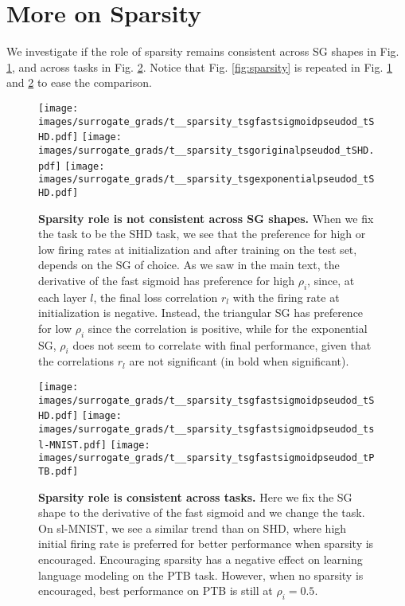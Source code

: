 \section{More on Sparsity}\label{app:more_sparsity}

We investigate if the role of sparsity remains consistent across SG shapes in Fig. \ref{fig:sparsity_and_shape}, and across tasks in Fig. \ref{fig:sparsity_and_task}. Notice that Fig. \ref{fig:sparsity} is repeated in Fig. \ref{fig:sparsity_and_shape} and \ref{fig:sparsity_and_task} to ease the comparison.


\begin{figure}
    \centering
    \vspace{.55cm}
    \texttt{[image: images/surrogate\_grads/t\_\_sparsity\_tsgfastsigmoidpseudod\_tSHD.pdf]}
    \texttt{[image: images/surrogate\_grads/t\_\_sparsity\_tsgoriginalpseudod\_tSHD.pdf]}
    \texttt{[image: images/surrogate\_grads/t\_\_sparsity\_tsgexponentialpseudod\_tSHD.pdf]}
    \caption{\textbf{Sparsity role is not consistent across SG shapes.} When we fix the task to be the SHD task, we see that the preference for high or low firing rates at initialization and after training on the test set, depends on the SG of choice. As we saw in the main text, 
    the derivative of the fast sigmoid has preference for high $\rho_i$, since, at each layer $l$, the final loss correlation $r_l$ with the firing rate at initialization is negative.
    Instead, the triangular SG has preference for low $\rho_i$ since the correlation is positive, while for the exponential SG, $\rho_i$ does not seem to correlate with final performance, given that the correlations $r_l$ are not significant (in bold when significant).}
    \label{fig:sparsity_and_shape}
\end{figure}


\begin{figure}
    \centering
    \texttt{[image: images/surrogate\_grads/t\_\_sparsity\_tsgfastsigmoidpseudod\_tSHD.pdf]}
    \texttt{[image: images/surrogate\_grads/t\_\_sparsity\_tsgfastsigmoidpseudod\_tsl-MNIST.pdf]}
    \texttt{[image: images/surrogate\_grads/t\_\_sparsity\_tsgfastsigmoidpseudod\_tPTB.pdf]}
    \caption{\textbf{Sparsity role is consistent across tasks.} Here we fix the SG shape to the derivative of the fast sigmoid and we change the task. On sl-MNIST, we see a similar trend than on SHD, where high initial firing rate is preferred for better performance when sparsity is encouraged. Encouraging sparsity has a negative effect on learning language modeling on the PTB task. However, when no sparsity is encouraged, best performance on PTB is still at $\rho_i=0.5$.}
    \label{fig:sparsity_and_task}
\end{figure}




